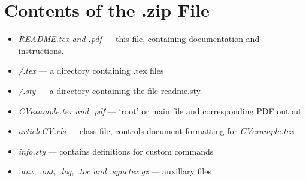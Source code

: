 \section{Contents of the .zip File}

\begin{itemize}
\item \textit{README.tex and .pdf} --- this file, containing documentation and instructions.
\item \textit{/.tex} --- a directory containing .tex files
\item \textit{/.sty} --- a directory containing the file readme.sty
\item \textit{CVexample.tex and .pdf} --- `root' or main file and corresponding PDF output
\item \textit{articleCV.cls} --- class file, controls document formatting for \emph{CVexample.tex}
\item \textit{info.sty} --- contains definitions for custom commands
\item \textit{.aux, .out, .log, .toc and .synctex.gz} --- auxillary files
\end{itemize}